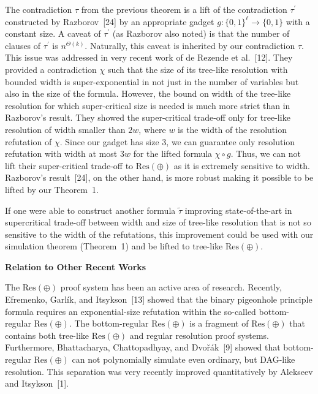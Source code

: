 The contradiction $\tau$ from the previous theorem is a lift of the contradiction $\tau^{\prime}$ constructed by Razborov [24] by an appropriate gadget $g:\{0,1\}^{\ell}\to\{0,1\}$ with a constant size.
A caveat of $\tau^{\prime}$ (as Razborov also noted) is that the number of clauses of $\tau^{\prime}$ is $n^{\Theta(k)}$.
Naturally, this caveat is inherited by our contradiction $\tau$.
This issue was addressed in very recent work of de Rezende et al. [12].
They provided a contradiction $\chi$ such that the size of its tree-like resolution with bounded width is super-exponential in not just in the number of variables but also in the size of the formula.
However, the bound on width of the tree-like resolution for which super-critical size is needed is much more strict than in Razborov’s result.
They showed the super-critical trade-off only for tree-like resolution of width smaller than $2w$, where $w$ is the width of the resolution refutation of $\chi$.
Since our gadget has size 3, we can guarantee only resolution refutation with width at most $3w$ for the lifted formula $\chi\circ g$.
Thus, we can not lift their super-critical trade-off to $\text{Res}(\oplus)$ as it is extremely sensitive to width.
Razborov’s result [24], on the other hand, is more robust making it possible to be lifted by our Theorem 1.\par




If one were able to construct another formula $\tilde{\tau}$ improving state-of-the-art in supercritical trade-off between width and size of tree-like resolution that is not so sensitive to the width of the refutations, this improvement could be used with our simulation theorem (Theorem 1) and be lifted to tree-like $\text{Res}(\oplus)$.\par




\par\medskip\noindent\textbf{Relation to Other Recent Works}\par




The $\text{Res}(\oplus)$ proof system has been an active area of research.
Recently, Efremenko, Garlík, and Itsykson [13] showed that the binary pigeonhole principle formula requires an exponential-size refutation within the so-called bottom-regular $\text{Res}(\oplus)$.
The bottom-regular $\text{Res}(\oplus)$ is a fragment of $\text{Res}(\oplus)$ that contains both tree-like $\text{Res}(\oplus)$ and regular resolution proof systems.
Furthermore, Bhattacharya, Chattopadhyay, and Dvořák [9] showed that bottom-regular $\text{Res}(\oplus)$ can not polynomially simulate even ordinary, but DAG-like resolution.
This separation was very recently improved quantitatively by Alekseev and Itsykson [1].\par




